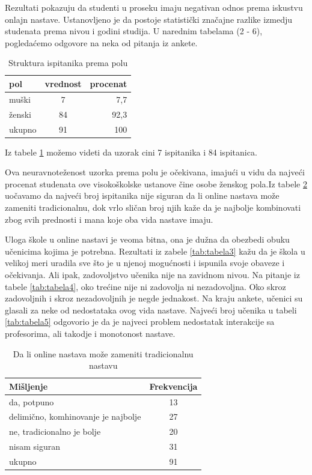 \documentclass{article}
\begin{document}
Rezultati pokazuju da studenti u proseku imaju negativan odnos prema iskustvu onlajn nastave. Ustanovljeno je da postoje statistički značajne razlike izmedju studenata prema nivou i godini studija. U narednim tabelama (2 - 6), pogledaćemo odgovore na neka od pitanja iz ankete.\cite{5}

\begin{table}[h!]
\centering
{}
  \begin{tabular}{ | l | c | r |}
    \hline
    pol & vrednost & procenat \\ \hline
    muški & 7 & 7,7 \\ \hline 
    ženski & 84 & 92,3 \\ \hline
    ukupno & 91 & 100 \\
    \hline
  \end{tabular}
  \caption{Struktura ispitanika prema polu}
  \label{tab:tabela1}
\end{table}

Iz tabele \ref{tab:tabela1} možemo videti da uzorak cini 7 ispitanika i 84 ispitanica.

Ova neuravnoteženost uzorka prema polu je očekivana, imajući u vidu da najveći procenat studenata ove visokoškolske ustanove čine osobe ženskog pola.Iz tabele \ref{tab:tabela2} uočavamo da najveći broj ispitanika nije siguran da li online nastava može zameniti tradicionalnu, dok vrlo sličan broj njih kaže da je najbolje kombinovati zbog svih prednosti i mana koje oba vida nastave imaju.

Uloga škole u online nastavi je veoma bitna, ona je dužna da obezbedi obuku učenicima kojima je potrebna. Rezultati iz zabele \ref{tab:tabela3} kažu da je škola u velikoj meri uradila sve što je u njenoj mogućnosti i ispunila svoje obaveze i očekivanja. Ali ipak, zadovoljstvo učenika nije na zavidnom nivou. Na pitanje iz tabele \ref{tab:tabela4}, oko trećine nije ni zadovolja ni nezadovoljna. Oko skroz zadovoljnih i skroz nezadovoljnih je negde jednakost. Na kraju ankete, učenici su glasali za neke od nedostataka ovog vida nastave. Najveći broj učenika u tabeli \ref{tab:tabela5} odgovorio je da je najveci problem nedostatak interakcije sa profesorima, ali takodje i monotonost nastave. 

\begin{table}[h!]
\centering
{}
  \begin{tabular}{ | l | c |}
    \hline
    Mišljenje & Frekvencija \\ \hline
    da, potpuno & 13  \\ \hline 
    delimično, komhinovanje je najbolje & 27  \\ \hline
    ne, tradicionalno je bolje & 20  \\ \hline
    nisam siguran & 31 \\ \hline
    ukupno &  91 \\
    \hline
  \end{tabular}
  \caption{Da li online nastava može zameniti tradicionalnu nastavu}
  \label{tab:tabela2}
\end{table}
\end{document}
